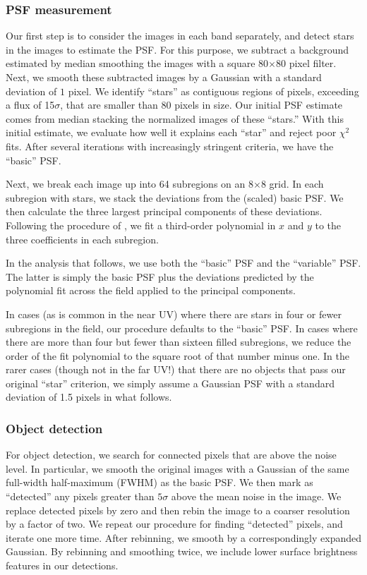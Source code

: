 \documentclass[10pt,preprint]{aastex}
\begin{document}
\subsubsection{PSF measurement}

Our first step is to consider the images in each band separately, and
detect stars in the images to estimate the PSF.  For this purpose, we
subtract a background estimated by median smoothing the images with a
square 80$\times$80 pixel filter. Next, we smooth these subtracted
images by a Gaussian with a standard deviation of $1$ pixel. We
identify ``stars'' as contiguous regions of pixels, exceeding a flux
of 15$\sigma$, that are smaller than 80 pixels in size. Our initial
PSF estimate comes from median stacking the normalized images of these
``stars.'' With this initial estimate, we evaluate how well it
explains each ``star'' and reject poor $\chi^2$ fits.  After several
iterations with increasingly stringent criteria, we have the ``basic''
PSF. 

Next, we break each image up into 64 subregions on an 8$\times$8 grid.
In each subregion with stars, we stack the deviations from the
(scaled) basic PSF. We then calculate the three largest principal
components of these deviations. Following the procedure of
\citet{lupton03a}, we fit a third-order polynomial in $x$ and $y$ to
the three coefficients in each subregion.

In the analysis that follows, we use both the ``basic'' PSF and the
``variable'' PSF.  The latter is simply the basic PSF plus the
deviations predicted by the polynomial fit across the field applied to
the principal components.

In cases (as is common in the near UV) where there are stars in four
or fewer subregions in the field, our procedure defaults to the
``basic'' PSF. In cases where there are more than four but fewer than
sixteen filled subregions, we reduce the order of the fit polynomial
to the square root of that number minus one. In the rarer cases
(though not in the far UV!) that there are no objects that pass our
original ``star'' criterion, we simply assume a Gaussian PSF with a
standard deviation of 1.5 pixels in what follows.

\subsubsection{Object detection}

For object detection, we search for connected pixels that are above
the noise level.  In particular, we smooth the original images with a
Gaussian of the same full-width half-maximum (FWHM) as the basic
PSF. We then mark as ``detected'' any pixels greater than $5\sigma$
above the mean noise in the image. We replace detected pixels by zero
and then rebin the image to a coarser resolution by a factor of
two. We repeat our procedure for finding ``detected'' pixels, and
iterate one more time.  After rebinning, we smooth by a
correspondingly expanded Gaussian.  By rebinning and smoothing twice,
we include lower surface brightness features in our detections.
\end{document}
